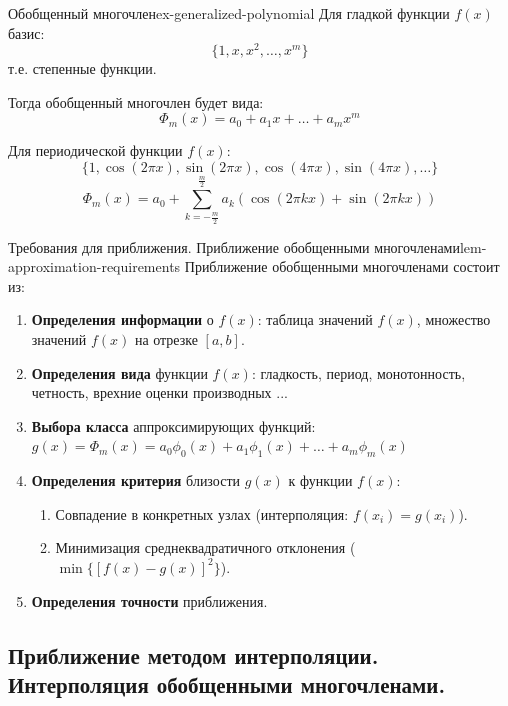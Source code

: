 \documentclass[14pt]{extarticle}
\begin{document}
    \clearpage
    \begin{example}{Обобщенный многочлен}{ex-generalized-polynomial}
        Для гладкой функции $f(x)$ базис:
        $$\{1, x, x^{2}, \ldots, x^{m}\}$$
        т.е. степенные функции.

        Тогда обобщенный многочлен будет вида:
        $$\Phi_{m}(x) = a_{0} + a_{1}x + \ldots + a_{m}x^{m}$$

        \vspace{\baselineskip}

        Для периодической функции $f(x)$:
        $$\{1, \cos(2\pi x), \sin(2\pi x), \cos(4\pi x), \sin(4\pi x), \ldots\}$$
        $$\Phi_{m}(x) = a_{0} + \sum_{k=-\frac{m}{2}}^{\frac{m}{2}} a_{k}(\cos(2\pi kx) + \sin(2\pi kx))$$
    \end{example}

    \begin{lemma}{Требования для приближения. Приближение обобщенными многочленами}{lem-approximation-requirements}
        Приближение обобщенными многочленами состоит из:
        \begin{enumerate}
            \item \textbf{Определения информации} о $f(x)$: таблица значений $f(x)$, множество значений $f(x)$ на отрезке $[a, b]$.
            \item \textbf{Определения вида} функции $f(x)$: гладкость, период, монотонность, четность, врехние оценки производных ...
            \item \textbf{Выбора класса} аппроксимирующих функций: $g(x) = \Phi_{m}(x) = a_{0}\phi_{0}(x) + a_{1}\phi_{1}(x) + \ldots + a_{m}\phi_{m}(x)$ 
            \item \textbf{Определения критерия} близости $g(x)$ к функции $f(x)$:
                  \begin{enumerate}
                      \item Совпадение в конкретных узлах (интерполяция: $f(x_{i}) = g(x_{i})$).
                      \item Минимизация среднеквадратичного отклонения ($\min\{[f(x) - g(x)]^{2}\}$).
                  \end{enumerate}
            \item \textbf{Определения точности} приближения.
        \end{enumerate}
    \end{lemma}

\clearpage
\subsection{Приближение методом интерполяции. Интерполяция обобщенными многочленами.}
\end{document}
